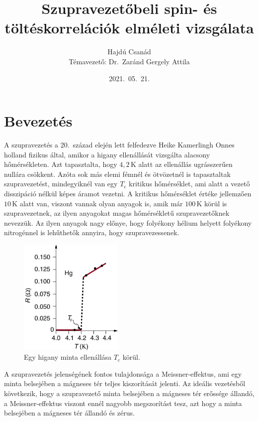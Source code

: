 \documentclass[a4paper,12pt,titlepage]{article}
\title{\bf Szupravezetőbeli spin- és töltéskorrelációk elméleti vizsgálata}
\author{Hajdú Csanád \\ \small Témavezető: Dr.\ Zaránd Gergely Attila}
\date{2021.\ 05.\ 21.}
\begin{document}
\maketitle

\tableofcontents \newpage


\section{Bevezetés}

A szupravezetés a 20.\ század elején lett felfedezve Heike Kamerlingh Onnes holland fizikus által, amikor a higany ellenállását vizsgálta alacsony hőmérsékleten.  Azt tapasztalta, hogy $4,2$\,K alatt az ellenállás ugrásszerűen nullára csökkent.  Azóta sok más elemi fémnél és ötvözetnél is tapasztaltak szupravezetést, mindegyiknél van egy $T_\text{c}$ kritikus hőmérséklet, ami alatt a vezető disszipáció nélkül képes áramot vezetni.  A kritikus hőmérséklet értéke jellemzően $10$\,K alatt van, viszont vannak olyan anyagok is, amik már $100$\,K körül is szupravezetnek, az ilyen anyagokat magas hőmérsékletű szupravezetőknek nevezzük.  Az ilyen anyagok nagy előnye, hogy folyékony hélium helyett folyékony nitrogénnel is lehűthetők annyira, hogy szupravezessenek.

\begin{figure}[h!]
	\centering
	\includegraphics[width=5cm]{higany_R-vs-T.jpg}
	\caption[]{Egy higany minta ellenállása $T_\text{c}$ körül.\footnotemark}
\end{figure}

A szupravezetés jelenségének fontos tulajdonsága a Meissner-effektus, ami egy minta belsejében a mágneses tér teljes kiszorítását jelenti.  Az ideális vezetésből következik, hogy a szupravezető minta belsejében a mágneses tér erőssége állandó, a Meissner-effektus viszont ennél nagyobb megszorítást tesz, azt hogy a minta belsejében a mágneses tér állandó és zérus.
\end{document}
